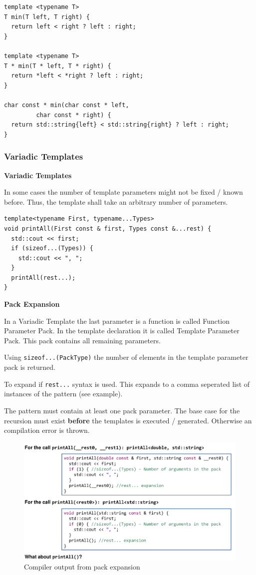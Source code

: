 \documentclass[11pt,twoside,landscape]{article}
\begin{document}
\begin{multicols}{3}
\lstset{language=c++,label= ,caption= ,captionpos=b,numbers=none}
\begin{lstlisting}
template <typename T>
T min(T left, T right) {
  return left < right ? left : right;
}

template <typename T>
T * min(T * left, T * right) {
  return *left < *right ? left : right;
}

char const * min(char const * left,
		 char const * right) {
  return std::string{left} < std::string{right} ? left : right;
}
\end{lstlisting}

\subsubsection{Variadic Templates}
\label{sec:orga344627}
\textbf{Variadic Templates}

In some cases the number of template parameters might not be fixed / known before.
Thus, the template shall take an arbitrary number of parameters.

\lstset{language=c++,label= ,caption= ,captionpos=b,numbers=none}
\begin{lstlisting}
template<typename First, typename...Types>
void printAll(First const & first, Types const &...rest) {
  std::cout << first;
  if (sizeof...(Types)) {
    std::cout << ", ";
  }
  printAll(rest...);
}
\end{lstlisting}

\textbf{Pack Expansion}

In a Variadic Template the last parameter is a function is called Function Parameter Pack.
In the template declaration it is called Template Parameter Pack.
This pack contains all remaining parameters.

Using \texttt{sizeof...(PackType)} the number of elements in the template parameter pack is returned.

To expand if \texttt{rest...} syntax is used.
This expands to a comma seperated list of instances of the pattern (see example).

The pattern must contain at least one pack parameter.
The base case for the recursion must exist \textbf{before} the templates is executed / generated.
Otherwise an compilation error is thrown.



\begin{figure}[htbp]
\centering
\includegraphics[width=.9\linewidth]{img/variadic_template_pack_expansion.png}
\caption{Compiler output from pack expansion}
\end{figure}


\end{multicols}
\end{document}
